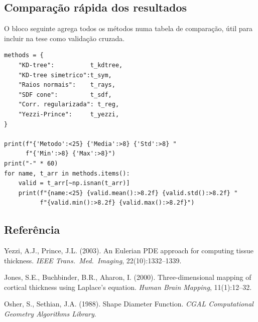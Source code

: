 \subsection{Comparação rápida dos resultados}
\label{impl:compare}

O bloco seguinte agrega todos os métodos numa tabela de comparação,
útil para incluir na tese como validação cruzada.

\begin{lstlisting}
methods = {
    "KD-tree":          t_kdtree,
    "KD-tree simetrico":t_sym,
    "Raios normais":    t_rays,
    "SDF cone":         t_sdf,
    "Corr. regularizada": t_reg,
    "Yezzi-Prince":     t_yezzi,
}

print(f"{'Metodo':<25} {'Media':>8} {'Std':>8} "
      f"{'Min':>8} {'Max':>8}")
print("-" * 60)
for name, t_arr in methods.items():
    valid = t_arr[~np.isnan(t_arr)]
    print(f"{name:<25} {valid.mean():>8.2f} {valid.std():>8.2f} "
          f"{valid.min():>8.2f} {valid.max():>8.2f}")
\end{lstlisting}

\subsection*{Referência}

\begin{enumerate}[label={[\arabic*]}, nosep]
  \item Yezzi, A.J., Prince, J.L. (2003). An Eulerian PDE approach
        for computing tissue thickness. \emph{IEEE Trans.\ Med.\
        Imaging}, 22(10):1332–1339.
        \label{yezzi2003}
  \item Jones, S.E., Buchbinder, B.R., Aharon, I. (2000).
        Three-dimensional mapping of cortical thickness using
        Laplace's equation. \emph{Human Brain Mapping},
        11(1):12–32.
  \item Osher, S., Sethian, J.A. (1988). Shape Diameter Function.
        \emph{CGAL Computational Geometry Algorithms Library}.
\end{enumerate}
